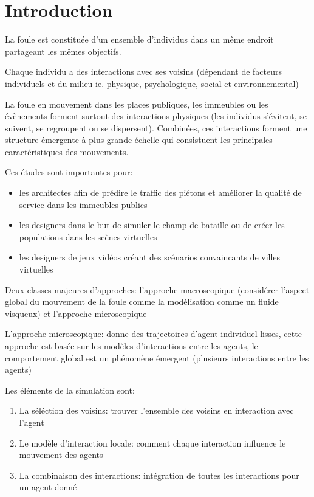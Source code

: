 \documentclass[11pt]{report}
\begin{document}
\section{Introduction}

La foule est constituée d'un ensemble d'individus dans un même endroit partageant les mêmes objectifs.

Chaque individu a des interactions avec ses voisins (dépendant de facteurs individuels et du milieu ie. physique, psychologique, social et environnemental)

La foule en mouvement dans les places publiques, les immeubles ou les évènements forment surtout des interactions physiques (les individus s'évitent, se suivent, se regroupent ou se dispersent). Combinées, ces interactions forment une structure émergente à plus grande échelle qui consistuent les principales caractéristiques des mouvements.

Ces études sont importantes pour:
\begin{itemize}
\item les architectes afin de prédire le traffic des piétons et améliorer la qualité de service dans les immeubles publics
\item les designers dans le but de simuler le champ de bataille ou de créer les populations dans les scènes virtuelles
\item les designers de jeux vidéos créant des scénarios convaincants de villes virtuelles
\end{itemize}

Deux classes majeures d'approches: l'approche macroscopique (considérer l'aspect global du mouvement de la foule comme la modélisation comme un fluide visqueux) et l'approche microscopique

L'approche microscopique: donne des trajectoires d'agent individuel lisses, cette approche est basée sur les modèles d'interactions entre les agents, le comportement global est un phénomène émergent (plusieurs interactions entre les agents)

Les éléments de la simulation sont:

\begin{enumerate}
\item La séléction des voisins: trouver l'ensemble des voisins en interaction avec l'agent
\item Le modèle d'interaction locale: comment chaque interaction influence le mouvement des agents
\item La combinaison des interactions: intégration de toutes les interactions pour un agent donné
\end{enumerate}
\end{document}
